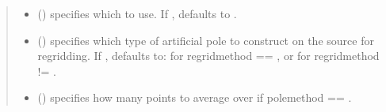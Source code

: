 \documentclass[letterpaper,10pt,english]{sphinxmanual}
\begin{document}
\begin{fulllineitems}
\begin{quote}
\begin{description}
\begin{itemize}
\item {} 
 ({\hyperref[\detokenize{RegridMethod:ESMF.api.constants.RegridMethod}]{}}) \textendash{} specifies which
{\hyperref[\detokenize{RegridMethod:ESMF.api.constants.RegridMethod}]{}} to use.  If , defaults
to {\hyperref[\detokenize{RegridMethod:ESMF.api.constants.RegridMethod.BILINEAR}]{}}.

\item {} 
 ({\hyperref[\detokenize{PoleMethod:ESMF.api.constants.PoleMethod}]{}}) \textendash{} specifies which type of artificial pole
to construct on the source {\hyperref[\detokenize{grid:ESMF.api.grid.Grid}]{}} for regridding.  If
, defaults to: {\hyperref[\detokenize{PoleMethod:ESMF.api.constants.PoleMethod.NONE}]{}} for
regridmethod == {\hyperref[\detokenize{RegridMethod:ESMF.api.constants.RegridMethod.CONSERVE}]{}}, or
{\hyperref[\detokenize{PoleMethod:ESMF.api.constants.PoleMethod.ALLAVG}]{}} for
regridmethod != {\hyperref[\detokenize{RegridMethod:ESMF.api.constants.RegridMethod.CONSERVE}]{}}.

\item {} 
 () \textendash{} specifies how many points to average over
if polemethod == {\hyperref[\detokenize{PoleMethod:ESMF.api.constants.PoleMethod.ALLAVG}]{}}.


\end{itemize}
\end{description}
\end{quote}
\end{fulllineitems}
\end{document}
